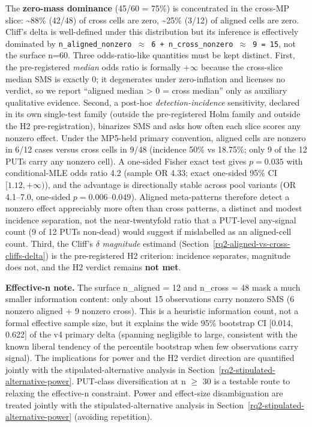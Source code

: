 \documentclass[manuscript,screen,review]{acmart}
\begin{document}
The \textbf{zero-mass dominance} (45/60 = 75\%) is concentrated in the
cross-MP slice: \textasciitilde88\% (42/48) of cross cells are zero,
\textasciitilde25\% (3/12) of aligned cells are zero. Cliff's delta is
well-defined under this distribution but its inference is effectively
dominated by
\texttt{n\_aligned\_nonzero\ $\approx$\ 6\ +\ n\_cross\_nonzero\ $\approx$\ 9\ =\ 15}, not the
surface n=60. Three odds-ratio-like quantities must be kept distinct.
First, the pre-registered \emph{median} odds ratio is formally $+\infty$
because the cross-slice median SMS is exactly 0; it degenerates under
zero-inflation and licenses no verdict, so we report ``aligned median
\textgreater{} 0 = cross median'' only as auxiliary qualitative evidence.
Second, a post-hoc \emph{detection-incidence} sensitivity, declared in
its own single-test family (outside the pre-registered Holm family and
outside the H2 pre-registration), binarizes SMS and asks how often each
slice scores any nonzero effect. Under the MP5-held primary convention,
aligned cells are nonzero in 6/12 cases versus cross cells in 9/48
(incidence 50\% vs 18.75\%; only 9 of the 12 PUTs carry any nonzero
cell). A one-sided Fisher exact test gives $p = 0.035$ with
conditional-MLE odds ratio 4.2 (sample OR 4.33; exact one-sided 95\% CI
$[1.12, +\infty)$), and the advantage is directionally stable across
pool variants (OR 4.1--7.0, one-sided $p = 0.006$--$0.049$). Aligned
meta-patterns therefore detect a nonzero effect appreciably more often
than cross patterns, a distinct and modest incidence separation, not the
near-twentyfold ratio that a PUT-level any-signal count (9 of 12 PUTs
non-dead) would suggest if mislabelled as an aligned-cell count. Third,
the Cliff's $\delta$ \emph{magnitude} estimand
(Section~\ref{rq2-aligned-vs-cross-cliffs-delta}) is the pre-registered
H2 criterion: incidence separates, magnitude does not, and the H2
verdict remains \textbf{not met}.

\textbf{Effective-n note.} The surface n\_aligned = 12 and n\_cross = 48
mask a much smaller information content: only about 15 observations carry
nonzero SMS (6 nonzero aligned + 9 nonzero cross). This is a heuristic
information count, not a formal effective sample size, but it explains the
wide 95\% bootstrap CI {[}0.014, 0.622{]} of the v4 primary delta
(spanning negligible to large, consistent with the known liberal tendency of the percentile
bootstrap when few observations carry signal). The implications for power and the H2 verdict direction are
quantified jointly with the stipulated-alternative analysis in Section~\ref{rq2-stipulated-alternative-power}.
PUT-class diversification at n $\geq$ 30 is a testable route to relaxing
the effective-n constraint. Power and effect-size disambiguation are
treated jointly with the stipulated-alternative analysis in Section~\ref{rq2-stipulated-alternative-power}
(avoiding repetition).
\end{document}
